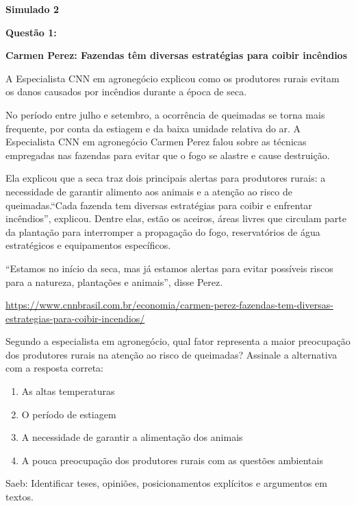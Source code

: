 \textbf{Simulado 2}

\textbf{Questão 1:}

\textbf{Carmen Perez: Fazendas têm diversas estratégias para coibir
incêndios}

A Especialista CNN em agronegócio explicou como os produtores rurais
evitam os danos causados por incêndios durante a época de seca.

No período entre julho e setembro, a ocorrência de queimadas se torna
mais frequente, por conta da estiagem e da baixa umidade relativa do ar.
A Especialista CNN em agronegócio Carmen Perez falou sobre as técnicas
empregadas nas fazendas para evitar que o fogo se alastre e cause
destruição.

Ela explicou que a seca traz dois principais alertas para produtores
rurais: a necessidade de garantir alimento aos animais e a atenção ao
risco de queimadas.``Cada fazenda tem diversas estratégias para coibir e
enfrentar incêndios'', explicou. Dentre elas, estão os aceiros, áreas
livres que circulam parte da plantação para interromper a propagação do
fogo, reservatórios de água estratégicos e equipamentos específicos.

``Estamos no início da seca, mas já estamos alertas para evitar
possíveis riscos para a natureza, plantações e animais'', disse Perez.

\href{https://www.cnnbrasil.com.br/economia/carmen-perez-fazendas-tem-diversas-estrategias-para-coibir-incendios/}{{https://www.cnnbrasil.com.br/economia/carmen-perez-fazendas-tem-diversas-estrategias-para-coibir-incendios/}}

Segundo a especialista em agronegócio, qual fator representa a maior
preocupação dos produtores rurais na atenção ao risco de queimadas?
Assinale a alternativa com a resposta correta:

\begin{enumerate}
\def\labelenumi{\alph{enumi})}
\item
  As altas temperaturas
\item
  O período de estiagem
\item
  A necessidade de garantir a alimentação dos animais
\item
  A pouca preocupação dos produtores rurais com as questões ambientais
\end{enumerate}

Saeb: Identificar teses, opiniões, posicionamentos explícitos e
argumentos em textos.

